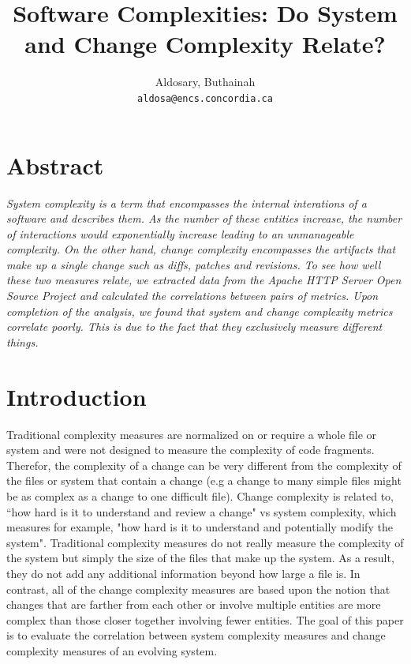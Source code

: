 \documentclass[9pt,twocolumn,a4paper]{article}
\begin{document}
\author{Aldosary, Buthainah\\
\texttt{aldosa@encs.concordia.ca}}

\date{}
\title{\bf{Software Complexities: Do System and Change Complexity Relate?}}




\maketitle
\section{Abstract}
{\em System complexity is a term that encompasses the internal interations of a software and describes them. As the number of these entities increase, the number of interactions would exponentially increase leading to an unmanageable complexity. On the other hand, change complexity encompasses the artifacts that make up a single change such as diffs, patches and revisions. To see how well these two measures relate, we extracted data from the Apache HTTP Server Open Source Project and calculated the correlations between pairs of metrics. Upon completion of the analysis, we found that system and change complexity metrics correlate poorly. This is due to the fact that they exclusively measure different things.

}
\section{Introduction}

Traditional complexity measures are normalized on or require a whole file or system and were not designed to measure the complexity of code fragments. Therefor, the complexity of a change can be very different from the complexity of the files or system that contain a change (e.g a change to many simple files might be as complex as a change to one difficult file). Change complexity is related to, ``how hard is it to understand and review a change" vs system complexity, which measures for example, "how hard is it to understand and potentially modify the system". Traditional complexity measures do not really measure the complexity of the system but simply the size of the files that make up the system. As a result, they do not add any additional information beyond how large a file is. In contrast, all of the change complexity measures are based upon the notion that changes that are farther from each other or involve multiple entities are more complex than those closer together involving fewer entities. The goal of this paper is to evaluate the correlation between system complexity measures and change complexity measures of an evolving system. 
\newline
\end{document}

